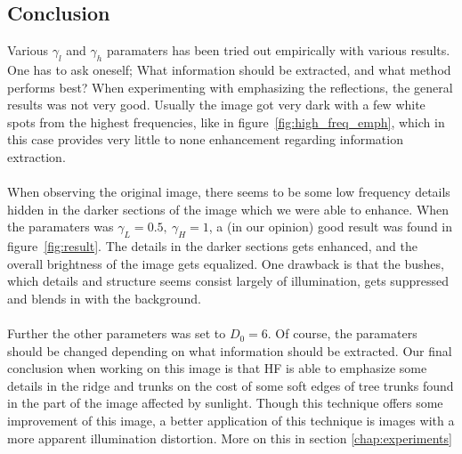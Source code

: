 		\subsection{Conclusion}
		Various $\gamma_l$ and $\gamma_h$ paramaters has been tried out empirically with 
		various results. One has to ask oneself; What information should be extracted, and what 
		method performs best? When experimenting with emphasizing the reflections, the 
		general results was not very good. Usually the image got very dark with a few white
		spots from the highest frequencies, like in figure~\ref{fig:high_freq_emph}, which
		in this case provides very little to none enhancement regarding information extraction.\\
		\\
		When observing the original image, there seems to be some 
		low frequency details hidden in the darker sections of the image which we were able
		to enhance. When the paramaters was $\gamma_L = 0.5,~\gamma_H = 1$, a (in our opinion)
		good result was 
		found in figure~\ref{fig:result}. The details in the darker sections gets enhanced, 
		and the overall brightness
		of the image gets equalized. One drawback is that the bushes, which details 
		and structure seems consist
		largely of illumination, gets suppressed and blends in with the background.\\
		\\
		Further the other parameters was set to $D_0 = 6$. Of course,
		the paramaters should be changed depending on what information should be extracted.
		Our final conclusion when working on this image is that HF
		is able to emphasize some details in the ridge and trunks on the cost of some soft edges of tree trunks found in the part of the image affected by sunlight. Though this technique offers some improvement of this image, a better application of this technique is images with a more apparent illumination distortion. More on this in section \ref{chap:experiments}
